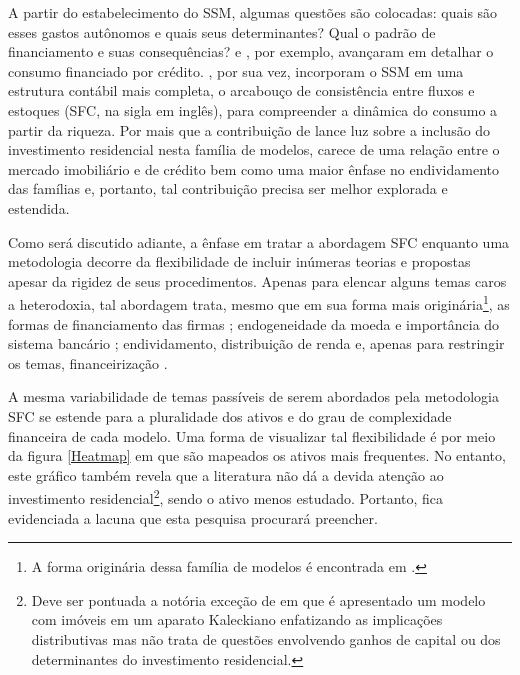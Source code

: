 A partir do estabelecimento do SSM, algumas questões são colocadas: quais são esses gastos autônomos e quais seus determinantes? Qual o padrão de financiamento e suas consequências? \textcite{pariboni_household_2016} e \textcite{fagundes_dinamica_2017}, por exemplo, avançaram em detalhar o consumo financiado por crédito.  \textcite{brochier_supermultiplier_2018}, por sua vez, incorporam o SSM em uma estrutura contábil mais completa, o arcabouço de consistência entre fluxos e estoques (SFC, na sigla em inglês), para compreender a dinâmica do consumo a partir da riqueza. Por mais que a contribuição de \textcite{da_silveira_investimento_2019} lance luz sobre a inclusão do investimento residencial nesta família de modelos, carece de uma relação entre o mercado imobiliário e de crédito bem como uma maior ênfase no endividamento das famílias e, portanto, tal contribuição precisa ser melhor explorada e estendida.

Como será discutido adiante, a ênfase em tratar a abordagem SFC enquanto uma metodologia decorre da flexibilidade de incluir inúmeras teorias e propostas apesar da rigidez de seus procedimentos. Apenas para elencar alguns temas caros a heterodoxia, tal abordagem trata, mesmo que em sua forma mais originária\footnote{A forma originária dessa família de modelos é encontrada em \textcite{godley_macroeconomics_1983}.}, as formas de financiamento das firmas \cites{asimakopulos_kalecki_1983}{skott_finance_1988}{messori_financing_1991}; endogeneidade da moeda e importância do sistema bancário \cites{messori_financing_1991}{dow_horizontalism:_1996}{arestis_theoretical_1996}{godley_money_1999}; endividamento, distribuição de renda e, apenas para restringir os temas, financeirização \cites{palley_inside_1996}{wolfson_irving_1996}{palley_money_1997}{palley_financial_2002}{dos_santos_revisiting_2009}{palley_inside_2010}{hein_finance-dominated_2012}.

A mesma variabilidade de temas passíveis de serem abordados pela metodologia SFC se estende para a pluralidade dos ativos e do grau de complexidade financeira de cada modelo. Uma forma de visualizar tal flexibilidade é por meio da figura \ref{Heatmap} em que são mapeados os ativos mais frequentes. No entanto, este gráfico também revela que a literatura não dá a devida atenção ao investimento residencial\footnote{Deve ser pontuada a notória exceção de \textcite{zezza_u.s._2008} em que é apresentado um modelo com imóveis em um aparato Kaleckiano enfatizando as implicações distributivas mas não trata de questões envolvendo ganhos de capital ou dos determinantes do investimento residencial.}, sendo o ativo menos estudado. Portanto, fica evidenciada a lacuna que esta pesquisa procurará preencher.

